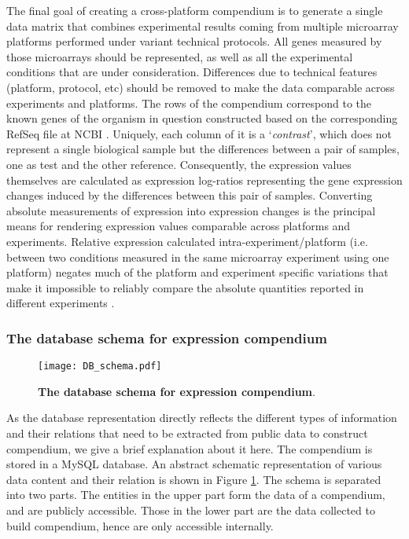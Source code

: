 The final goal of creating a cross-platform compendium is to generate a single data matrix that combines experimental results coming from multiple microarray platforms performed under variant technical protocols.  All genes measured by those microarrays should be represented, as well as all the experimental conditions that are under consideration.  Differences due to technical features (platform, protocol, etc) should be removed to make the data comparable across experiments and platforms. The rows of the compendium correspond to the known genes of the organism in question constructed based on the corresponding RefSeq file at NCBI \cite{Pruitt2007}. Uniquely, each column of it is a `\textit{contrast}', which does not represent a single biological sample but the differences between a pair of samples, one as test and the other reference. Consequently, the expression values themselves are calculated as expression log-ratios representing the gene expression changes induced by the differences between this pair of samples. Converting absolute measurements of expression into expression changes is the principal means for rendering expression values comparable across platforms and experiments. Relative expression calculated intra-experiment/platform (i.e. between two conditions measured in the same microarray experiment using one platform) negates much of the platform and experiment specific variations that make it impossible to reliably compare the absolute quantities reported in different experiments \cite{Shi2006}.



\subsubsection{The database schema for expression compendium}\label{sec:command-db-schema}

\begin{figure}
  \centering
  \texttt{[image: DB\_schema.pdf]}
  \caption[The database schema for expression compendium]{ \textbf{The
      database schema for expression compendium}.
  }
  \label{fig:comp-db-schema}
\end{figure}

As the database representation directly reflects the different types of information and their relations that need to be extracted from public data to construct compendium, we give a brief explanation about it here. The compendium is stored in a MySQL database. An abstract schematic representation of various data content and their relation is shown in Figure \ref{fig:comp-db-schema}. The schema is separated into two parts. The entities in the upper part form the data of a compendium, and are publicly accessible. Those in the lower part are the data collected to build compendium, hence are only accessible internally.

